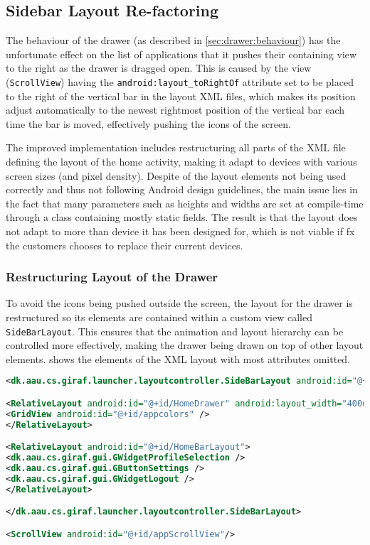 \subsection{Sidebar Layout Re-factoring}
The behaviour of the drawer (as described in \cref{sec:drawer:behaviour}) has the unfortunate effect on the list of applications that it pushes their containing view to the right as the drawer is dragged open.
This is caused by the view (\lstinline|ScrollView|) having the  \lstinline{android:layout_toRightOf} attribute set to be placed to the right of the vertical bar in the layout XML files, which makes its position adjust automatically to the newest rightmost position of the vertical bar each time the bar is moved, effectively pushing the icons of the screen.

The improved implementation includes restructuring all parts of the XML file defining the layout of the home activity, making it adapt to devices with various screen sizes (and pixel density).
Despite of the layout elements not being used correctly and thus not following Android design guidelines, the main issue lies in the fact that many parameters such as heights and widths are set at compile-time through a class containing mostly static fields.
The result is that the layout does not adapt to more than device it has been designed for, which is not viable if fx the customers chooses to replace their current devices.

\subsubsection{Restructuring Layout of the Drawer}\label{sec:sidebarlayout:xml}
To avoid the icons being pushed outside the screen, the layout for the drawer is restructured so its elements are contained within a custom view called \lstinline|SideBarLayout|.
This ensures that the animation and layout hierarchy can be controlled more effectively, making the drawer being drawn on top of other layout elements.
 shows the elements of the XML layout with most attributes omitted.

\begin{lstlisting}[caption={Structure of the XML layout of the drawer.},label={lst:sidebarlayout}, language=XML]
<dk.aau.cs.giraf.launcher.layoutcontroller.SideBarLayout android:id="@+id/SideBarLayout" android:layout_marginLeft="-400dp">

<RelativeLayout android:id="@+id/HomeDrawer" android:layout_width="400dp">
<GridView android:id="@+id/appcolors" />
</RelativeLayout>

<RelativeLayout android:id="@+id/HomeBarLayout">
<dk.aau.cs.giraf.gui.GWidgetProfileSelection />
<dk.aau.cs.giraf.gui.GButtonSettings />
<dk.aau.cs.giraf.gui.GWidgetLogout />
</RelativeLayout>

</dk.aau.cs.giraf.launcher.layoutcontroller.SideBarLayout>

<ScrollView android:id="@+id/appScrollView"/>
\end{lstlisting}

